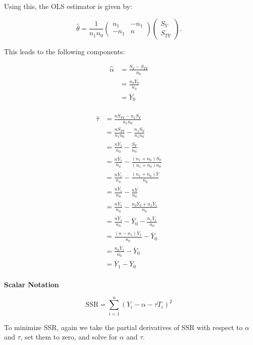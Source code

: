 \documentclass{article}
\begin{document}
Using this, the OLS estimator is given by:

\[
\hat{\theta} = \frac{1}{n_1 n_0} \begin{pmatrix}
n_1 & -n_1 \\
- n_1 & n
\end{pmatrix} \begin{pmatrix}
S_Y \\
S_{TY}
\end{pmatrix}.
\]

This leads to the following components:

\begin{align*}
  \hat{\alpha} &= \frac{S_Y - S_{TY}}{n_0} \\
               &= \frac{n_0 \overline{Y}_0}{n_0} \\
               &= \overline{Y}_0 \\
\end{align*}

\begin{align*}
  \hat{\tau} &= \frac{n S_{TY} - n_1 S_Y}{n_1 n_0} \\
             &= \frac{n S_{TY}}{n_1 n_0} - \frac{n_1 S_Y}{n_1 n_0} \\
             &= \frac{n \overline{Y}_1}{n_0} - \frac{S_Y}{n_0} \\
             &= \frac{n \overline{Y}_1}{n_0} - \frac{(n_1 + n_0) S_Y}{(n_1 + n_0)n_0} \\
             &= \frac{n \overline{Y}_1}{n_0} - \frac{(n_1 + n_0) \overline{Y}}{n_0} \\
             &= \frac{n \overline{Y}_1}{n_0} - \frac{n \overline{Y}}{n_0} \\
             &= \frac{n \overline{Y}_1}{n_0} - \frac{n_0 \overline{Y}_0 + n_1 \overline{Y}_1}{n_0} \\
             &= \frac{n \overline{Y}_1}{n_0} - \overline{Y}_0 - \frac{n_1 \overline{Y}_1}{n_0} \\
             &= \frac{(n - n_1) \overline{Y}_1}{n_0} - \overline{Y}_0 \\
             &= \frac{n_0 \overline{Y}_1}{n_0} - \overline{Y}_0 \\
             &= \overline{Y}_1 - \overline{Y}_0 \\
\end{align*}

\textbf{Scalar Notation}

\[
\text{SSR} = \sum_{i=1}^{n} (Y_i - \alpha - \tau T_i)^2
\]

To minimize SSR, again we take the partial derivatives of SSR with respect to \( \alpha \) and \( \tau \), set them to zero, and solve for \( \alpha \) and \( \tau \).
\end{document}

